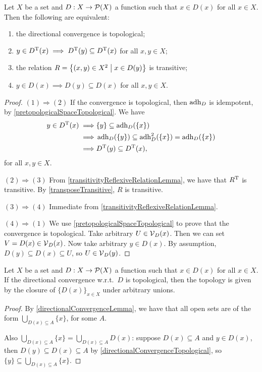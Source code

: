 \begin{proposition} \label{directionalConvergenceTopological}
Let $X$ be a set and $D: X\to \operatorname{\mathcal{P}}(X)$ a function such that $x\in D(x)$ for all $x\in X$. Then the following are equivalent:
\begin{enumerate}
\item the directional convergence is topological;
\item $y\in D^{\mathrm{T}}(x) \implies D^{\mathrm{T}}(y)\subseteq D^{\mathrm{T}}(x)$ for all $x,y\in X$;
\item the relation $R = \setbuilder{(x,y)\in X^2}{x\in D(y)}$ is transitive;
\item $y\in D(x) \implies D(y)\subseteq D(x)$ for all $x,y\in X$.
\end{enumerate}
\end{proposition}
\begin{proof}
$(1) \Rightarrow (2)$ If the convergence is topological, then $\operatorname{adh}_D$ is idempotent, by \ref{pretopologicalSpaceTopological}.
We have
\begin{align*}
y\in D^{\mathrm{T}}(x) \implies& \{y\} \subseteq \operatorname{adh}_D(\{x\}) \\ \implies& \operatorname{adh}_D(\{y\}) \subseteq \operatorname{adh}_D^2(\{x\}) = \operatorname{adh}_D(\{x\}) \\
\implies& D^{\mathrm{T}}(y)\subseteq D^{\mathrm{T}}(x),
\end{align*}
for all $x,y\in X$.

$(2) \Rightarrow (3)$ From \ref{transitivityReflexiveRelationLemma}, we have that $R^{\mathrm{T}}$ is transitive. By \ref{transposeTransitive}, $R$ is transitive.

$(3) \Rightarrow (4)$ Immediate from \ref{transitivityReflexiveRelationLemma}.

$(4) \Rightarrow (1)$ We use \ref{pretopologicalSpaceTopological} to prove that the convergence is topological. Take arbitrary $U\in \operatorname{\mathcal{V}}_D(x)$. Then we can set $V = D(x)\in \operatorname{\mathcal{V}}_D(x)$. Now take arbitrary $y\in D(x)$. By assumption, $D(y) \subseteq D(x) \subseteq U$, so $U\in \operatorname{\mathcal{V}}_D(y)$.
\end{proof}

\begin{proposition} \label{topologyDirectionalConvergence}
Let $X$ be a set and $D: X\to \operatorname{\mathcal{P}}(X)$ a function such that $x\in D(x)$ for all $x\in X$. If the directional convergence w.r.t.\ $D$ is topological, then the topology is given by the closure of $\{D(x)\}_{x\in X}$ under arbitrary unions.
\end{proposition}
\begin{proof}
By \ref{directionalConvergenceLemma}, we have that all open sets are of the form $\bigcup_{D(x)\subseteq A}\{x\}$, for some $A$.

Also $\bigcup_{D(x)\subseteq A}\{x\} = \bigcup_{D(x)\subseteq A}D(x)$: suppose $D(x)\subseteq A$ and $y\in D(x)$, then $D(y)\subseteq D(x)\subseteq A$ by \ref{directionalConvergenceTopological}, so $\{y\}\subseteq \bigcup_{D(x)\subseteq A}\{x\}$.
\end{proof}

